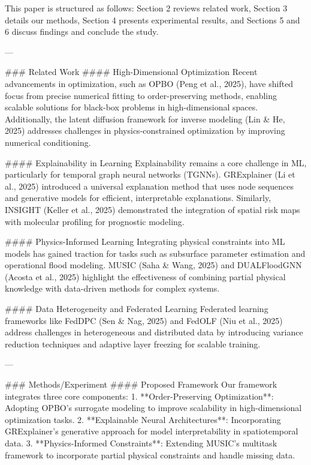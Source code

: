 This paper is structured as follows: Section 2 reviews related work, Section 3 details our methods, Section 4 presents experimental results, and Sections 5 and 6 discuss findings and conclude the study.

---

### Related Work
#### High-Dimensional Optimization
Recent advancements in optimization, such as OPBO (Peng et al., 2025), have shifted focus from precise numerical fitting to order-preserving methods, enabling scalable solutions for black-box problems in high-dimensional spaces. Additionally, the latent diffusion framework for inverse modeling (Lin & He, 2025) addresses challenges in physics-constrained optimization by improving numerical conditioning.

#### Explainability in Learning
Explainability remains a core challenge in ML, particularly for temporal graph neural networks (TGNNs). GRExplainer (Li et al., 2025) introduced a universal explanation method that uses node sequences and generative models for efficient, interpretable explanations. Similarly, INSIGHT (Keller et al., 2025) demonstrated the integration of spatial risk maps with molecular profiling for prognostic modeling.

#### Physics-Informed Learning
Integrating physical constraints into ML models has gained traction for tasks such as subsurface parameter estimation and operational flood modeling. MUSIC (Saha & Wang, 2025) and DUALFloodGNN (Acosta et al., 2025) highlight the effectiveness of combining partial physical knowledge with data-driven methods for complex systems.

#### Data Heterogeneity and Federated Learning
Federated learning frameworks like FedDPC (Sen & Nag, 2025) and FedOLF (Niu et al., 2025) address challenges in heterogeneous and distributed data by introducing variance reduction techniques and adaptive layer freezing for scalable training.

---

### Methods/Experiment
#### Proposed Framework
Our framework integrates three core components:
1. **Order-Preserving Optimization**: Adopting OPBO's surrogate modeling to improve scalability in high-dimensional optimization tasks.
2. **Explainable Neural Architectures**: Incorporating GRExplainer's generative approach for model interpretability in spatiotemporal data.
3. **Physics-Informed Constraints**: Extending MUSIC's multitask framework to incorporate partial physical constraints and handle missing data.

